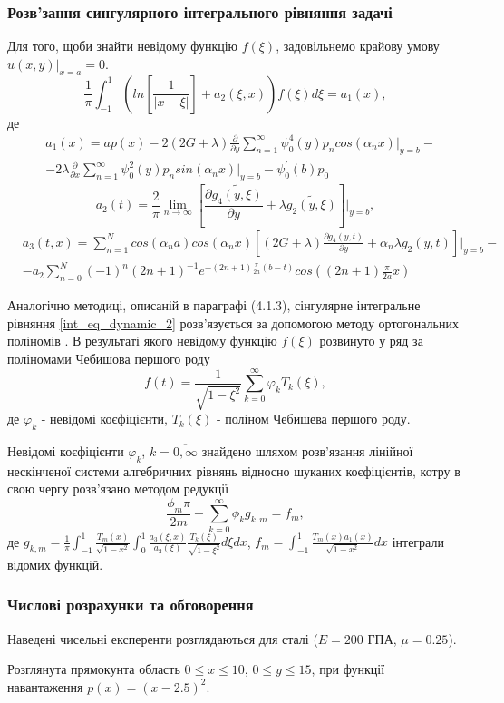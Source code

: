 \subsubsection{Розв'зання сингулярного інтегрального рівняння задачі}
Для того, щоби знайти невідому функцію $f(\xi)$, задовільнемо крайову умову $u(x, y) |_{x=a} = 0$.
\begin{equation}\label{int_eq_dynamic_2}
    \frac{1}{\pi} \int_{-1}^{1} \left( ln\left[ \frac{1}{\lvert x - \xi \rvert} \right] + a_2(\xi, x) \right) f(\xi) d\xi = a_1(x),
\end{equation}
де
\begin{align*}
    &a_1(x) = a p(x) - 2(2G + \lambda) \frac{\partial}{\partial y} \sum_{n=1}^{\infty} \psi_0^{4}(y) p_n cos(\alpha_n x)|_{y=b} - \nonumber \\
    &- 2\lambda \frac{\partial}{\partial x} \sum_{n=1}^{\infty}\psi_0^2(y) p_n sin(\alpha_n x)|_{y=b} - \psi_0^{'}(b) p_0
\end{align*}
\begin{equation*}
    a_2(t) = \frac{2}{\pi} \lim_{n \rightarrow \infty}\left[ \frac{\partial \widetilde{g_4(y, \xi)}}{\partial y} + \lambda \widetilde{g_2(y, \xi)} \right]|_{y=b}, 
\end{equation*}
\begin{align*}
    &a_3(t, x) = \sum_{n=1}^{N} cos(\alpha_n a) cos(\alpha_n x) \left[(2G + \lambda) \frac{\partial g_4(y, t)}{\partial y} + \alpha_n \lambda g_2(y, t) \right]|_{y=b} - \\
    & - a_2 \sum_{n=0}^{N} (-1)^n (2n + 1)^{-1} e^{-(2n + 1) \frac{\pi}{2a} (b - t)} cos((2n + 1) \frac{\pi}{2a} x)
\end{align*}

Аналогічно методиці, описаній в параграфі (4.1.3), сінгулярне інтегральне рівняння \eqref{int_eq_dynamic_2}
розв'язується за допомогою методу ортогональних поліномів \cite{popov_3}.
В результаті якого невідому функцію $f(\xi)$ розвинуто у ряд за поліномами Чебишова першого роду
\begin{equation}\label{unk_fun_dynamic_2}
    f(t) = \frac{1}{\sqrt{1 - \xi^2}} \sum_{k=0}^{\infty} \varphi_k T_{k}(\xi),
\end{equation}
де $\varphi_k$ - невідомі коєфіцієнти, $T_{k}(\xi)$ - поліном Чебишева першого роду.

Невідомі коєфіцієнти $\varphi_k$, $k=\overline{0, \infty}$ знайдено шляхом розв'язання лінійної нескінченої системи алгебричних рівнянь відносно шуканих коєфіцієнтів,
котру в свою чергу розв'язано методом редукції
\begin{equation}\label{int_system_dynamic_2}
    \frac{\phi_m \pi}{2m} + \sum_{k=0}^{\infty} \phi_k g_{k, m} = f_m,
\end{equation}
де $g_{k, m} = \frac{1}{\pi} \int_{-1}^{1} \frac{T_{m}(x)}{\sqrt{1 - x^2}} \int_{0}^{1} \frac{a_3(\xi, x )}{a_2(\xi)} \frac{T_{k}(\xi)}{\sqrt{1 - \xi^2}} d\xi dx$,
$f_m = \int_{-1}^{1} \frac{T_{m}(x) a_1(x)}{\sqrt{1 - x^2}} dx$ інтеграли відомих функцій.

\subsubsection{Числові розрахунки та обговорення}
Наведені чисельні експеренти розглядаються для сталі ($E=200$ ГПА, $\mu=0.25$).

Розглянута прямокунта область $0 \le x \le 10$, $0 \le y \le 15$, при функції навантаження $p(x)=(x-2.5)^2$.
